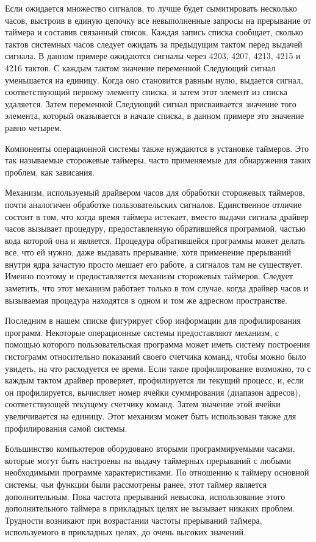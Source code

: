 Если ожидается множество сигналов, то лучше будет сымитировать несколько часов,
выстроив в единую цепочку все невыполненные запросы на прерывание от таймера
и составив связанный список. Каждая запись списка сообщает, сколько
тактов системных часов следует ожидать за предыдущим тактом перед выдачей сигнала. В данном примере ожидаются сигналы через 4203, 4207, 4213, 4215 и 4216 тактов.
С каждым тактом значение переменной Следующий сигнал уменьшается на единицу. Когда оно становится равным нулю, выдается сигнал, соответствующий первому элементу списка, и затем этот элемент из списка удаляется. Затем переменной Следующий сигнал присваивается
значение того элемента, который оказывается в начале списка, в данном примере это
значение равно четырем.

Компоненты операционной системы также нуждаются в установке таймеров. Это
так называемые сторожевые таймеры, часто применяемые для обнаружения таких проблем, как зависания.

Механизм, используемый драйвером часов для обработки сторожевых таймеров, почти аналогичен обработке пользовательских сигналов. Единственное отличие состоит
в том, что когда время таймера истекает, вместо выдачи сигнала драйвер часов вызывает процедуру, предоставленную обратившейся программой, частью кода которой
она и является. Процедура обратившейся программы может делать все, что ей нужно,
даже выдавать прерывание, хотя применение прерываний внутри ядра зачастую просто
мешает его работе, а сигналов там не существует. Именно поэтому и предоставляется механизм сторожевых таймеров. Следует заметить, что этот механизм работает только
в том случае, когда драйвер часов и вызываемая процедура находятся в одном и том же
адресном пространстве.

Последним в нашем списке фигурирует сбор информации для профилирования
программ. Некоторые операционные системы предоставляют механизм, с помощью
которого пользовательская программа может иметь систему построения гистограмм относительно показаний своего счетчика команд, чтобы можно было увидеть, на что расходуется ее время. Если такое профилирование возможно, то с каждым тактом драйвер
проверяет, профилируется ли текущий процесс, и, если он профилируется, вычисляет
номер ячейки суммирования (диапазон адресов), соответствующей текущему счетчику
команд. Затем значение этой ячейки увеличивается на единицу. Этот механизм может
быть использован также для профилирования самой системы.

Большинство компьютеров оборудовано вторыми программируемыми часами, которые
могут быть настроены на выдачу таймерных прерываний с любыми необходимыми
программе характеристиками. По отношению к таймеру основной системы, чьи функции были рассмотрены ранее, этот таймер является дополнительным. Пока частота
прерываний невысока, использование этого дополнительного таймера в прикладных
целях не вызывает никаких проблем. Трудности возникают при возрастании частоты
прерываний таймера, используемого в прикладных целях, до очень высоких значений.

